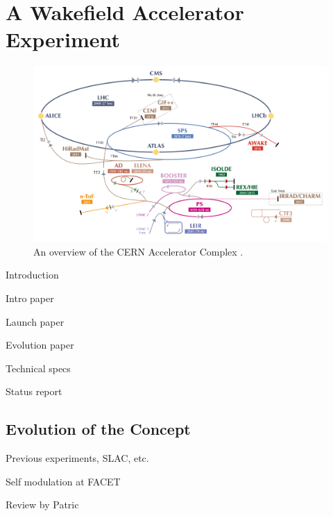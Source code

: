 %
%

\chapter{A Wakefield Accelerator Experiment}
\label{Ch:WFA}

\begin{figure}[hbt]
    \centering
    \includegraphics[width=0.99\linewidth,trim={20mm 25mm 20mm 20mm},clip]{figures/AcceleratorComplex}
    \caption{\label{Fig:WFA:AccComp} An overview of the CERN Accelerator Complex \cite{add:mobs:2016}.}
\end{figure}

Introduction

Intro paper \cite{caldwell:2009}

Launch paper \cite{awake_collaboration:2014}

Evolution paper \cite{caldwell:2016}

Technical specs \cite{gschwendtner:2016}

Status report \cite{awake_collaboration:2016}

\section{Evolution of the Concept}
\label{WFA:History}

Previous experiments, SLAC, etc.

\cite{rosenzweig:1988, blumenfeld:2007, kallos:2008, litos:2014}

Self modulation at FACET \cite{adli:2016}

Review by Patric \cite{muggli:2009}

